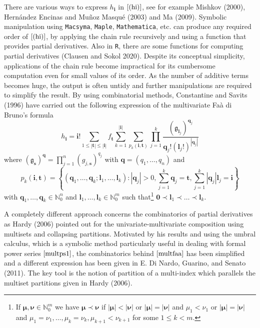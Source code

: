 There are various ways to express \(h_{\boldsymbol{i}}\) in \(\eqref{(hi)}\), see for example Mishkov (2000), Hernández Encinas and Muñoz Masqué (2003) and Ma (2009). Symbolic manipulation using \texttt{Macsyma}, \texttt{Maple}, \texttt{Mathematica}, etc. can produce any required order of \(\eqref{(hi)}\), by applying the chain rule recursively and using a function that provides partial derivatives. Also in \texttt{R}, there are some functions for computing partial derivatives (Clausen and Sokol 2020). Despite its conceptual simplicity, applications of the chain rule become impractical for its cumbersome computation even for small values of its order. As the number of additive terms becomes huge, the output is often untidy and further manipulations are required to simplify the result. By using combinatorial methods, Constantine and Savits (1996) have carried out the following expression of the multivariate Faà di Bruno's formula
\begin{equation} \label{multfaa}
h_{\boldsymbol{i}} = \boldsymbol{i}! \sum_{1 \leq |\boldsymbol{t}| \leq |\boldsymbol{i}|}
f_{\boldsymbol{t}} \sum_{k=1}^{|\boldsymbol{i}|} \sum_{p_k(\boldsymbol{i}, \boldsymbol{t})} \prod_{j=1}^k \frac{({\mathfrak g}_{\boldsymbol{l}_j})^{\boldsymbol{q}_j}}{\boldsymbol{q}_j! (\boldsymbol{l}_j!)^{|\boldsymbol{q}_j|}}
\end{equation}
where \(({\mathfrak g}_{\boldsymbol{s}})^{\boldsymbol{q}}=\prod_{j=1}^{n} (g_{j,\boldsymbol{s}})^{q_j}\) with \({\boldsymbol{q}}=(q_1, \ldots, q_n)\) and
\[
p_k(\boldsymbol{i}, \boldsymbol{t}) = \left\{(\boldsymbol{q}_1, \ldots, \boldsymbol{q}_k;
\boldsymbol{l}_1, \ldots, \boldsymbol{l}_k): |\boldsymbol{q}_j|>0, \sum_{j=1}^k \boldsymbol{q}_j = \boldsymbol{t},  \sum_{j=1}^k |\boldsymbol{q}_j|\boldsymbol{l}_j  = \boldsymbol{i}
\right\}\]
with \(\boldsymbol{q}_1, \ldots, \boldsymbol{q}_k \in {\mathbb N}_0^{n}\) and \(\boldsymbol{l}_1, \ldots, \boldsymbol{l}_k \in {\mathbb N}_0^{m}\) such that\footnote{If \(\boldsymbol{\mu}, \boldsymbol{\nu} \in {\mathbb N}_0^m\) we have \(\boldsymbol{\mu} \prec \boldsymbol{\nu}\) if \(|\boldsymbol{\mu}| < |\boldsymbol{\nu}|\) or \(|\boldsymbol{\mu}| = |\boldsymbol{\nu}|\) and \(\mu_1 < \nu_1\) or \(|\boldsymbol{\mu}| = |\boldsymbol{\nu}|\) and \(\mu_1 = \nu_1, \ldots, \mu_k = \nu_k, \mu_{k+1} < \nu_{k+1}\) for some \(1 \leq k < m.\)} \(\boldsymbol{0} \prec \boldsymbol{l}_1 \prec \ldots \prec \boldsymbol{l}_k.\)

A completely different approach concerns the combinatorics of partial derivatives as Hardy (2006) pointed out for the univariate-multivariate composition using multisets and collapsing partitions. Motivated by his results and using the umbral calculus, which is a symbolic method particularly useful in dealing with formal power series \(\eqref{multps1}\), the combinatorics behind \(\eqref{multfaa}\) has been simplified and a different expression has been given in E. Di Nardo, Guarino, and Senato (2011). The key tool is the notion of partition of a multi-index which parallels the multiset partitions given in Hardy (2006).

